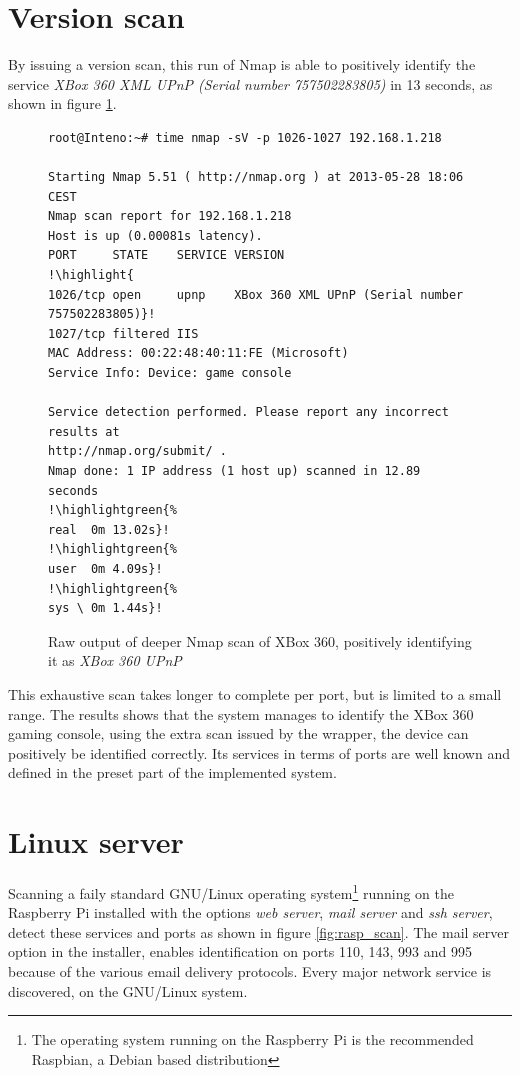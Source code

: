 \documentclass[a4paper,11pt,makeidx]{kth-bcs}
\newcommand{\reducedstrut}{\vrule width 0pt height .9\ht\strutbox depth .9\dp\strutbox\relax}
\newcommand{\highlight}[1]{%
  \begingroup
  \colorbox{light-gray!20}{\footnotesize\ttfamily#1\/}%
  \endgroup
}
\newcommand{\highlightgreen}[1]{%
  \begingroup
  \colorbox{light-green!20}{#1\/}%
  \endgroup
}
\begin{document}
\newpage
\section{Version scan}
By issuing a version scan, this run of Nmap is able to positively identify the service \emph{XBox 360 XML UPnP (Serial number 757502283805)} in 13 seconds, as shown in figure \ref{fig:nmapxbox}.
   \begin{figure}[h!]
      \centering
      \begin{lstlisting}[escapechar=!]
root@Inteno:~# time nmap -sV -p 1026-1027 192.168.1.218

Starting Nmap 5.51 ( http://nmap.org ) at 2013-05-28 18:06 CEST
Nmap scan report for 192.168.1.218
Host is up (0.00081s latency).
PORT     STATE    SERVICE VERSION
!\highlight{
1026/tcp open     upnp    XBox 360 XML UPnP (Serial number 757502283805)}!
1027/tcp filtered IIS
MAC Address: 00:22:48:40:11:FE (Microsoft)
Service Info: Device: game console

Service detection performed. Please report any incorrect results at
http://nmap.org/submit/ .
Nmap done: 1 IP address (1 host up) scanned in 12.89 seconds
!\highlightgreen{%
real  0m 13.02s}!
!\highlightgreen{%
user  0m 4.09s}!
!\highlightgreen{%
sys \ 0m 1.44s}!
      \end{lstlisting}
      \caption{
	 \small{
       Raw output of deeper Nmap scan of XBox 360, positively identifying it as \emph{XBox 360 UPnP}
	 }
      }
      \label{fig:nmapxbox}
   \end{figure}

This exhaustive scan takes longer to complete per port, but is limited to a small range.
The results shows that the system manages to identify the XBox 360 gaming console, using the extra scan issued by the wrapper, the device can positively be identified correctly.
Its services in terms of ports are well known and defined in the preset part of the implemented system.

\section{Linux server}
Scanning a faily standard GNU/Linux operating system\footnote{The operating system running on the Raspberry Pi is the recommended Raspbian, a Debian based distribution} running on the Raspberry Pi installed with the options \emph{web server}, \emph{mail server} and \emph{ssh server}, detect these services and ports as shown in figure \ref{fig:rasp_scan}.
The mail server option in the installer, enables identification on ports 110, 143, 993 and 995 because of the various email delivery protocols.
Every major network service is discovered, on the GNU/Linux system.
\end{document}
